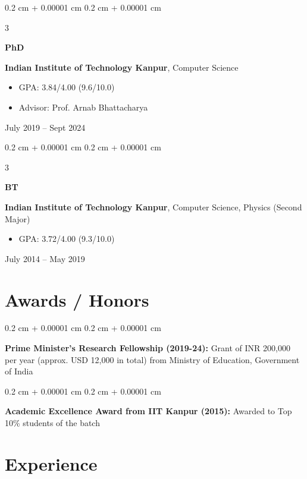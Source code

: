 \documentclass[12pt, letterpaper]{article}
\newenvironment{highlights}{
    \begin{itemize}[
        topsep=0.10 cm,
        parsep=0.10 cm,
        partopsep=0pt,
        itemsep=0pt,
        leftmargin=0.4 cm + 10pt
    ]
}{
    \end{itemize}
} %
\newenvironment{onecolentry}{
    \begin{adjustwidth}{
        0.2 cm + 0.00001 cm
    }{
        0.2 cm + 0.00001 cm
    }
}{
    \end{adjustwidth}
} %
\newenvironment{threecolentry}[3][]{
    \onecolentry
    \def\thirdColumn{#3}
    \setcolumnwidth{1 cm, \fill, 4.5 cm}
    \begin{paracol}{3}
    {\raggedright #2} \switchcolumn
}{
    \switchcolumn \raggedleft \thirdColumn
    \end{paracol}
    \endonecolentry
} %
\begin{document}
        
        \begin{threecolentry}{\textbf{PhD}}{
            July 2019 – Sept 2024
        }
            \textbf{Indian Institute of Technology Kanpur}, Computer Science
            \begin{highlights}
                \item GPA: 3.84/4.00 (9.6/10.0)
                \item Advisor: Prof. Arnab Bhattacharya
            \end{highlights}
        \end{threecolentry}

        \vspace{0.2 cm}

        \begin{threecolentry}{\textbf{BT}}{
            July 2014 – May 2019
        }
            \textbf{Indian Institute of Technology Kanpur}, Computer Science, Physics (Second Major)
            \begin{highlights}
                \item GPA: 3.72/4.00 (9.3/10.0)
            \end{highlights}
        \end{threecolentry}


    
    \section{Awards / Honors}



        
        \begin{onecolentry}
            \textbf{Prime Minister's Research Fellowship (2019-24):} Grant of INR 200,000 per year (approx. USD 12,000 in total) from Ministry of Education, Government of India
        \end{onecolentry}

        \vspace{0.2 cm}

        \begin{onecolentry}
            \textbf{Academic Excellence Award from IIT Kanpur (2015):} Awarded to Top 10\% students of the batch
        \end{onecolentry}


    
    \section{Experience}
\end{document}
